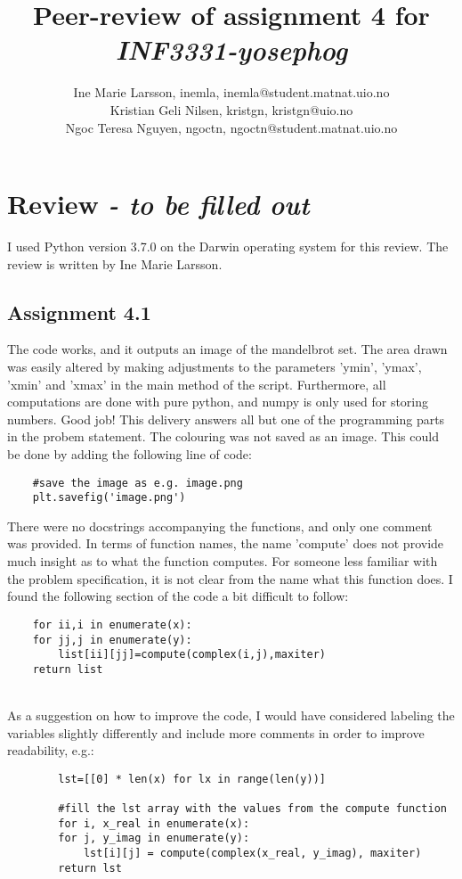 \documentclass[a4paper]{article}
\title{Peer-review of assignment 4 for \textit{INF3331-yosephog}}
\author{Ine Marie Larsson, inemla, {inemla@student.matnat.uio.no} \\
    Kristian Geli Nilsen, kristgn, {kristgn@uio.no} \\
    Ngoc Teresa Nguyen, ngoctn, {ngoctn@student.matnat.uio.no}}
\begin{document}
    \maketitle
    
    
    \section{Review \emph{- to be filled out}}\label{sec:review}
    
    I used Python version 3.7.0 on the Darwin operating
    system for this review. The review is written by Ine Marie Larsson.
    
    \subsection*{Assignment 4.1}
    The code works, and it outputs an image of the mandelbrot set. 
    The area drawn was easily altered by making adjustments to the 
    parameters 'ymin', 'ymax', 'xmin' and 'xmax' in the main 
    method of the script. Furthermore, all computations are 
    done with pure python, and numpy is only used for storing 
    numbers. Good job! This delivery answers all but one of the 
    programming parts in the probem statement. The colouring was not 
    saved as an image. This could be done by adding the following 
    line of code:\\
    \begin{verbatim}
    #save the image as e.g. image.png 
    plt.savefig('image.png')
    \end{verbatim}

    There were no docstrings accompanying the functions, and only
    one comment was provided.  In terms of function names, the 
    name 'compute' does not provide much insight as to what the 
    function computes. For someone less familiar with the problem
    specification, it is not clear from the name what this function 
    does. I found the following section of the code a bit difficult 
    to follow:\\
    \begin{verbatim}
    for ii,i in enumerate(x):
    for jj,j in enumerate(y):
        list[ii][jj]=compute(complex(i,j),maxiter)
    return list
    \end{verbatim}
    \\As a suggestion on how to improve the code, I would have 
    considered labeling the variables slightly differently and 
    include more comments in order to improve readability, e.g.:\\
    \begin{verbatim}
        lst=[[0] * len(x) for lx in range(len(y))]
        
        #fill the lst array with the values from the compute function
        for i, x_real in enumerate(x):
        for j, y_imag in enumerate(y):
            lst[i][j] = compute(complex(x_real, y_imag), maxiter)
        return lst
        \end{verbatim}
    
\end{document}
